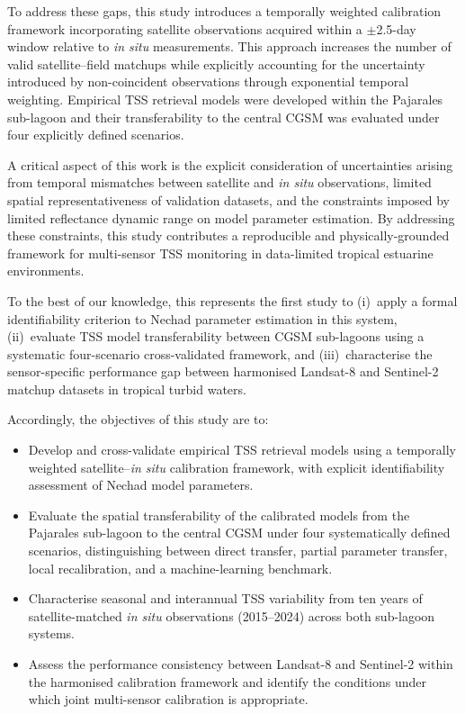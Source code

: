 \documentclass[remotesensing,article,submit,pdftex,moreauthors]{Definitions/mdpi}
\begin{document}
To address these gaps, this study introduces a temporally weighted
calibration framework incorporating satellite observations acquired
within a $\pm$2.5-day window relative to \textit{in situ} measurements.
This approach increases the number of valid satellite--field matchups
while explicitly accounting for the uncertainty introduced by
non-coincident observations through exponential temporal weighting.
Empirical TSS retrieval models were developed within the Pajarales
sub-lagoon and their transferability to the central CGSM was evaluated
under four explicitly defined scenarios.
 
A critical aspect of this work is the explicit consideration of
uncertainties arising from temporal mismatches between satellite and
\textit{in situ} observations, limited spatial representativeness of
validation datasets, and the constraints imposed by limited reflectance
dynamic range on model parameter estimation. By addressing these
constraints, this study contributes a reproducible and
physically-grounded framework for multi-sensor TSS monitoring in
data-limited tropical estuarine environments.
 
To the best of our knowledge, this represents the first study to
(i)~apply a formal identifiability criterion to Nechad parameter
estimation in this system, (ii)~evaluate TSS model transferability
between CGSM sub-lagoons using a systematic four-scenario
cross-validated framework, and (iii)~characterise the
sensor-specific performance gap between harmonised Landsat-8 and
Sentinel-2 matchup datasets in tropical turbid waters.
 
Accordingly, the objectives of this study are to:
 
\begin{itemize}
    \item Develop and cross-validate empirical TSS retrieval models
          using a temporally weighted satellite--\textit{in situ}
          calibration framework, with explicit identifiability
          assessment of Nechad model parameters.
 
    \item Evaluate the spatial transferability of the calibrated models
          from the Pajarales sub-lagoon to the central CGSM under four
          systematically defined scenarios, distinguishing between
          direct transfer, partial parameter transfer, local
          recalibration, and a machine-learning benchmark.
 
    \item Characterise seasonal and interannual TSS variability from
          ten years of satellite-matched \textit{in situ} observations
          (2015--2024) across both sub-lagoon systems.
 
    \item Assess the performance consistency between Landsat-8 and
          Sentinel-2 within the harmonised calibration framework and
          identify the conditions under which joint multi-sensor
          calibration is appropriate.
\end{itemize}
\end{document}
